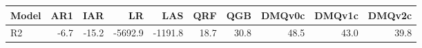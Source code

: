 \begin{tabular}{lrrrrrrrrr}
\toprule
Model & AR1 & IAR & LR & LAS & QRF & QGB & DMQv0c & DMQv1c & DMQv2c \\
\midrule
R2 & -6.7 & -15.2 & -5692.9 & -1191.8 & 18.7 & 30.8 & 48.5 & 43.0 & 39.8 \\
\bottomrule
\end{tabular}
